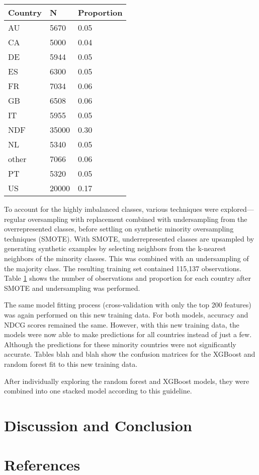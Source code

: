 \documentclass{article}
\begin{document}
\begin{table}[ht]
\centering
\begin{tabular}{| l | l | l |}
  \hline
  \textbf{Country} & \textbf{N} & \textbf{Proportion} \\ 
  \hline
  AU & 5670 & 0.05 \\ 
  CA & 5000 & 0.04 \\ 
  DE & 5944 & 0.05 \\ 
  ES & 6300 & 0.05 \\ 
  FR & 7034 & 0.06 \\ 
  GB & 6508 & 0.06 \\ 
  IT & 5955 & 0.05 \\ 
  NDF & 35000 & 0.30 \\ 
  NL & 5340 & 0.05 \\ 
  other & 7066 & 0.06 \\ 
  PT & 5320 & 0.05 \\ 
  US & 20000 & 0.17 \\ 
   \hline
\end{tabular}
\label{table:smote}
\end{table}

To account for the highly imbalanced classes, various techniques were explored---regular oversampling with 
replacement combined with undersampling from the overrepresented classes, before settling on 
synthetic minority oversampling techniques (SMOTE). With SMOTE, underrepresented classes are upsampled by
generating synthetic examples by selecting neighbors from the k-nearest neighbors of the minority classes. This was
combined with an undersampling of the majority class. The resulting training set contained 115,137 observations. 
Table \ref{table:smote} shows the number of observations and proportion for each country after SMOTE and 
undersampling was performed. 

The same model fitting process (cross-validation with only the top 200 features) was again performed 
on this new training data. For both models, accuracy and NDCG scores remained the same. However, with 
this new training data, the models were now able to make predictions for all countries instead of just a few. 
Although the predictions for these minority countries were not significantly accurate. Tables blah and blah 
show the confusion matrices for the XGBoost and random forest fit to this new training data. 

After individually exploring the random forest and XGBoost models, they were combined into one 
stacked model according to this guideline. 

\section{Discussion and Conclusion}


\section{References}
\end{document}
